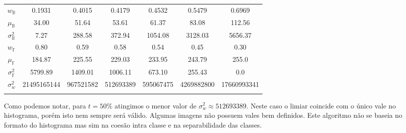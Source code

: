 \documentclass[a4paper,11pt]{article}
\begin{document}
\begin{center}
\begin{table}
\begin{tabular}[p]{@{}ccccccc@{}}
          \\
          $w_\mathbb{B}$ & 0.1931 & 0.4015 & 0.4179 & 0.4532 & 0.5479 & 0.6969 \\

          $\mu_\mathbb{B}$ & 34.00 & 51.64 & 53.61 & 61.37 & 83.08 & 112.56 \\

          $\sigma^{2}_{\mathbb{B}}$ & 7.27 & 288.58 & 372.94 & 1054.08 & 3128.03 & 5656.37 \\

          $w_{\mathbb{F}}$ & 0.80 & 0.59 & 0.58 & 0.54 & 0.45 & 0.30 \\

          $\mu_{\mathbb{F}}$ & 184.87 & 225.55 & 229.03 & 233.95 & 243.79 & 255.0 \\

          $\sigma^{2}_{\mathbb{F}}$ & 5799.89 & 1409.01 & 1006.11 & 673.10 & 255.43 & 0.0 \\

          $\sigma^{2}_{w}$ & 21495165144 & 967521582 & 512693389 & 595067475 & 4269882800 & 17660993341 \\

          \label{tab:otsu}
        \end{tabular}
      \end{table}
      \end{center}

      Como podemos notar, para $t = 50\%$ atingimos o menor valor de $\sigma^{2}_{w} \approx 512693389$. Neste caso o limiar coincide com o único vale no histograma, porém isto nem sempre será válido. Algumas imagens não possuem vales bem definidos. Este algoritmo não se baseia no formato do histograma mas sim na coesão intra classe e na separabilidade das classes.
\end{document}
